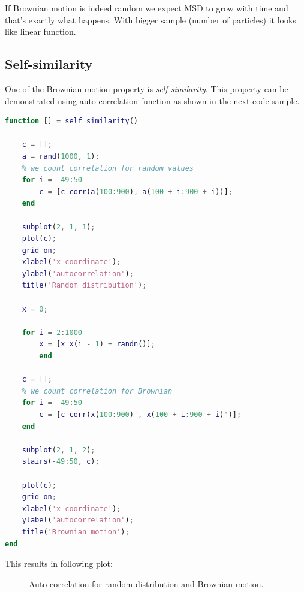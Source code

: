 \documentclass[12pt]{article}
\begin{document}
If Brownian motion is indeed random we expect MSD to grow with time and that's exactly what happens. With bigger sample (number of particles) it looks like linear function.

\subsection{Self-similarity}
One of the Brownian motion property is \textit{self-similarity}. This property can be demonstrated using auto-correlation function as shown in the next code sample.

\begin{lstlisting}[language=Matlab, caption = {Source code for auto-correlation}]
function [] = self_similarity()

	c = [];
	a = rand(1000, 1);
	% we count correlation for random values
	for i = -49:50
		c = [c corr(a(100:900), a(100 + i:900 + i))];
	end

	subplot(2, 1, 1);
	plot(c);
	grid on;
	xlabel('x coordinate');
	ylabel('autocorrelation');
	title('Random distribution');

	x = 0;

	for i = 2:1000
		x = [x x(i - 1) + randn()];
		end

	c = [];
	% we count correlation for Brownian
	for i = -49:50
		c = [c corr(x(100:900)', x(100 + i:900 + i)')];
	end

	subplot(2, 1, 2);
	stairs(-49:50, c);

	plot(c);
	grid on;
	xlabel('x coordinate');
	ylabel('autocorrelation');
	title('Brownian motion');
end
\end{lstlisting}

This results in following plot:

\begin{figure}[H]
	\centering
	\caption{Auto-correlation for random distribution and Brownian motion.}
\end{figure}
\end{document}
